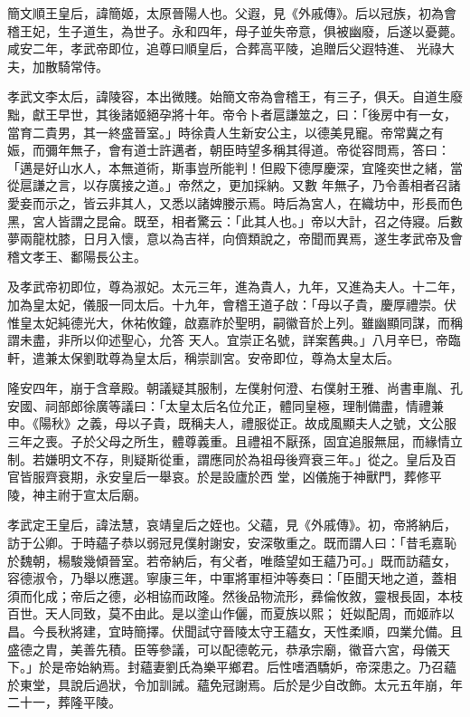 \begin{pinyinscope}
 簡文順王皇后，諱簡姬，太原晉陽人也。父遐，見《外戚傳》。后以冠族，初為會稽王妃，生子道生，為世子。永和四年，母子並失帝意，俱被幽廢，后遂以憂薨。咸安二年，孝武帝即位，追尊曰順皇后，合葬高平陵，追贈后父遐特進、
 光祿大夫，加散騎常侍。



 孝武文李太后，諱陵容，本出微賤。始簡文帝為會稽王，有三子，俱夭。自道生廢黜，獻王早世，其後諸姬絕孕將十年。帝令卜者扈謙筮之，曰：「後房中有一女，當育二貴男，其一終盛晉室。」時徐貴人生新安公主，以德美見寵。帝常冀之有娠，而彌年無子，會有道士許邁者，朝臣時望多稱其得道。帝從容問焉，答曰：「邁是好山水人，本無道術，斯事豈所能判！但殿下德厚慶深，宜隆奕世之緒，當從扈謙之言，以存廣接之道。」帝然之，更加採納。又數
 年無子，乃令善相者召諸愛妾而示之，皆云非其人，又悉以諸婢媵示焉。時后為宮人，在織坊中，形長而色黑，宮人皆謂之昆侖。既至，相者驚云：「此其人也。」帝以大計，召之侍寢。后數夢兩龍枕膝，日月入懷，意以為吉祥，向儕類說之，帝聞而異焉，遂生孝武帝及會稽文孝王、鄱陽長公主。



 及孝武帝初即位，尊為淑妃。太元三年，進為貴人，九年，又進為夫人。十二年，加為皇太妃，儀服一同太后。十九年，會稽王道子啟：「母以子貴，慶厚禮崇。伏惟皇太妃純德光大，休祐攸鐘，啟嘉祚於聖明，嗣徽音於上列。雖幽顯同謀，而稱謂未盡，非所以仰述聖心，允答
 天人。宜崇正名號，詳案舊典。」八月辛巳，帝臨軒，遣兼太保劉耽尊為皇太后，稱崇訓宮。安帝即位，尊為太皇太后。



 隆安四年，崩于含章殿。朝議疑其服制，左僕射何澄、右僕射王雅、尚書車胤、孔安國、祠部郎徐廣等議曰：「太皇太后名位允正，體同皇極，理制備盡，情禮兼申。《陽秋》之義，母以子貴，既稱夫人，禮服從正。故成風顯夫人之號，文公服三年之喪。子於父母之所生，體尊義重。且禮祖不厭孫，固宜追服無屈，而緣情立制。若嫌明文不存，則疑斯從重，謂應同於為祖母後齊衰三年。」從之。皇后及百官皆服齊衰期，永安皇后一舉哀。於是設廬於西
 堂，凶儀施于神獸門，葬修平陵，神主祔于宣太后廟。



 孝武定王皇后，諱法慧，哀靖皇后之姪也。父蘊，見《外戚傳》。初，帝將納后，訪于公卿。于時蘊子恭以弱冠見僕射謝安，安深敬重之。既而謂人曰：「昔毛嘉恥於魏朝，楊駿幾傾晉室。若帝納后，有父者，唯蔭望如王蘊乃可。」既而訪蘊女，容德淑令，乃舉以應選。寧康三年，中軍將軍桓沖等奏曰：「臣聞天地之道，蓋相須而化成；帝后之德，必相協而政隆。然後品物流形，彞倫攸敘，靈根長固，本枝百世。天人同致，莫不由此。是以塗山作儷，而夏族以熙；
 妊姒配周，而姬祚以昌。今長秋將建，宜時簡擇。伏聞試守晉陵太守王蘊女，天性柔順，四業允備。且盛德之胄，美善先積。臣等參議，可以配德乾元，恭承宗廟，徽音六宮，母儀天下。」於是帝始納焉。封蘊妻劉氏為樂平鄉君。后性嗜酒驕妒，帝深患之。乃召蘊於東堂，具說后過狀，令加訓誡。蘊免冠謝焉。后於是少自改飾。太元五年崩，年二十一，葬隆平陵。




\end{pinyinscope}
